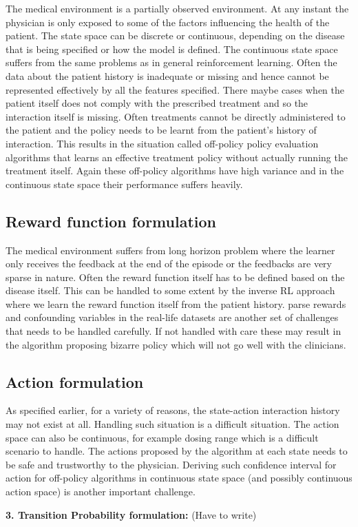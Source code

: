 The medical environment is a partially observed environment. At any instant the physician is only exposed to some of the factors influencing the health of the patient. The state space can be discrete or continuous, depending on the disease that is being specified or how the model is defined. The continuous state space suffers from the same problems as in general reinforcement learning. Often the data about the patient history is inadequate or missing and hence cannot be represented effectively by all the features specified. There maybe cases when the patient itself does not comply with the prescribed treatment and so the interaction itself is missing.  Often treatments cannot be directly administered to the patient and the policy needs to be learnt from the patient's history of interaction. This results in the situation called off-policy policy evaluation algorithms that learns an effective treatment policy without actually running the treatment itself. Again these off-policy algorithms have high variance and in the continuous state space their performance suffers heavily.

\subsection{Reward function formulation}

The medical environment suffers from long horizon problem where the learner only receives the feedback at the end of the episode or the feedbacks are very sparse in nature. Often the reward function itself has to be defined based on the disease itself. This can be handled to some extent by the inverse RL \citep{DBLP:conf/icml/NgR00} approach where we learn the reward function itself from the patient history. parse rewards and confounding variables in the real-life datasets are another set of challenges that needs to be handled carefully. If not handled with care these may result in the algorithm proposing bizarre policy which will not go well with the clinicians.

\subsection{Action formulation}


As specified earlier, for a variety of reasons, the state-action interaction history may not exist at all. Handling such situation is a difficult situation. The action space can also be  continuous, for example dosing range \citep{bastani2014model} which is a difficult scenario to handle. The actions proposed by the algorithm at each state needs to be safe and trustworthy to the physician. Deriving such confidence interval for action for off-policy algorithms in continuous state space (and possibly continuous action space) is another important challenge.

\textbf{3. Transition Probability formulation:} (Have to write)